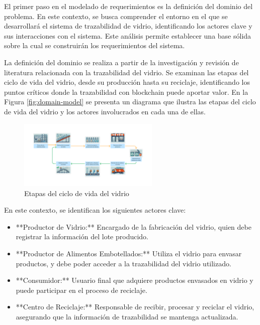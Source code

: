 El primer paso en el modelado de requerimientos es la definición del dominio del problema. En este contexto, se busca comprender el entorno en el que se desarrollará el sistema de trazabilidad de vidrio, identificando los actores clave y sus interacciones con el sistema. Este análisis permite establecer una base sólida sobre la cual se construirán los requerimientos del sistema.

La definición del dominio se realiza a partir de la investigación y revisión de literatura relacionada con la trazabilidad del vidrio. Se examinan las etapas del ciclo de vida del vidrio, desde su producción hasta su reciclaje, identificando los puntos críticos donde la trazabilidad con blockchain puede aportar valor. En la Figura \ref{fig:domain-model} se presenta un diagrama que ilustra las etapas del ciclo de vida del vidrio y los actores involucrados en cada una de ellas.

\begin{figure}[!htpb]
    \centering
    \includegraphics[width=0.6\textwidth]{Figures/glass-lifecycle.png}
    \caption{Etapas del ciclo de vida del vidrio}
    \label{fig:glass-lifecycle}
\end{figure}

En este contexto, se identifican los siguientes actores clave:
\begin{itemize}
		\item **Productor de Vidrio:** Encargado de la fabricación del vidrio, quien debe registrar la información del lote producido.
		\item **Productor de Alimentos Embotellados:** Utiliza el vidrio para envasar productos, y debe poder acceder a la trazabilidad del vidrio utilizado.
		\item **Consumidor:** Usuario final que adquiere productos envasados en vidrio y puede participar en el proceso de reciclaje.
		\item **Centro de Reciclaje:** Responsable de recibir, procesar y reciclar el vidrio, asegurando que la información de trazabilidad se mantenga actualizada.
\end{itemize}

